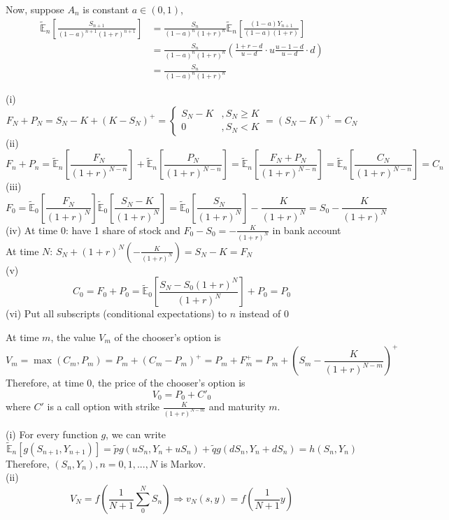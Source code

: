 \documentclass[12pt]{article}
\newenvironment{exercise}[2][Exercise]{\begin{trivlist}
		\item[\hskip \labelsep {\bfseries #1}\hskip \labelsep {\bfseries #2.}]}{\end{trivlist}}
\begin{document}
	Now, suppose $A_n$ is constant $a\in(0,1)$, 
	\begin{align*}
	\tilde{\mathbb{E}}_n\left[\frac{S_{n+1}}{(1-a)^{n+1}(1+r)^{n+1}}\right]&=\frac{S_n}{(1-a)^n(1+r)^n}\tilde{\mathbb{E}}_n\left[\frac{(1-a)Y_{n+1}}{(1-a)(1+r)}\right]\\
	&=\frac{S_n}{(1-a)^n(1+r)^n} \left(\frac{1+r-d}{u-d}\cdot u \frac{u-1-d}{u-d}\cdot d\right) \\ &=\frac{S_n}{(1-a)^n(1+r)^n}
	\end{align*}
	\begin{exercise}{11}	\end{exercise}
	(i) $$ F_N+P_N = S_N-K + (K-S_N)^+ = \begin{cases} S_N-K &,S_N\ge K\\0&, S_N<K\end{cases} = (S_N-K)^+=C_N$$
	(ii) $$F_n+P_n = \tilde{\mathbb{E}}_n\left[\frac{F_N}{(1+r)^{N-n}}\right]+\tilde{\mathbb{E}}_n\left[\frac{P_N}{(1+r)^{N-n}}\right]=\tilde{\mathbb{E}}_n\left[\frac{F_N+P_N}{(1+r)^{N-n}}\right]=\tilde{\mathbb{E}}_n\left[\frac{C_N}{(1+r)^{N-n}}\right]=C_n$$
	(iii)
	$$F_0 = \tilde{\mathbb{E}}_0\left[\frac{F_N}{(1+r)^{N}}\right]\tilde{\mathbb{E}}_0\left[\frac{S_N-K}{(1+r)^{N}}\right]=\tilde{\mathbb{E}}_0\left[\frac{S_N}{(1+r)^{N}}\right]-\frac{K}{(1+r)^{N}}=S_0-\frac{K}{(1+r)^{N}}$$
	(iv) At time 0: have 1 share of stock and $F_0-S_0=-\frac{K}{(1+r)^N}$ in bank account\\
	At time $N$: $S_N+(1+r)^N\left(-\frac{K}{(1+r)^N}\right)=S_N-K=F_N$\\
	(v) $$C_0 =F_0+P_0 = \tilde{\mathbb{E}}_0\left[\frac{S_N-S_0(1+r)^N}{(1+r)^{N}}\right]+P_0=P_0$$
	(vi) Put all subscripts (conditional expectations) to $n$ instead of $0$
	\begin{exercise}{12}\end{exercise}
	At time $m$, the value $V_m$ of the chooser's option is 
	$$V_m = \max(C_m,P_m) = P_m+(C_m-P_m)^+ =P_m+F_m^+ = P_m+\left(S_m-\frac{K}{(1+r)^{N-m}}\right)^+$$
	Therefore, at time 0, the price of the chooser's option is 
	$$V_0 = P_0+C'_0$$ where $C'$ is a call option with strike $\frac{K}{(1+r)^{N-m}}$ and maturity $m$. 
	\begin{exercise}{13}\end{exercise}
	(i) For every function $g$, we can write
	$$\tilde{\mathbb{E}}_n[g(S_{n+1},Y_{n+1})]=\tilde{p}g(uS_n,Y_n+uS_n)+\tilde{q}g(dS_n,Y_n+dS_n)=h(S_n,Y_n)$$
	Therefore, $(S_n,Y_n), n=0,1,...,N$ is Markov.\\
	(ii) $$V_N = f\left(\frac{1}{N+1}\sum_0^N S_n \right) \Rightarrow v_N(s,y) = f\left(\frac{1}{N+1}y\right)$$
\end{document}
